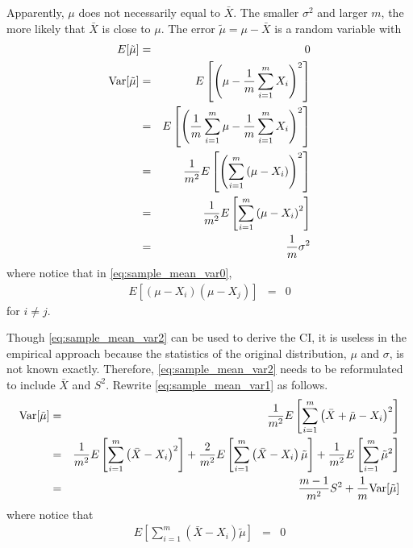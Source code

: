 Apparently, $\mu$ does not necessarily equal to $\bar{X}$. The smaller $\sigma^2$ and larger $m$, the more likely that $\bar{X}$ is close to $\mu$. The error $\tilde{\mu} = \mu - \bar{X}$ is a random variable with
\begin{eqnarray}
	E[\tilde{\mu}] &=& 0 \nonumber \\
	\textup{Var}[\tilde{\mu}] &=& E\left[\left(\mu-\dfrac{1}{m}\sum_{i=1}^{m} X_i\right)^2\right] \nonumber \\
	&=& E\left[\left(\dfrac{1}{m}\sum_{i=1}^{m}\mu-\dfrac{1}{m}\sum_{i=1}^{m} X_i\right)^2\right] \nonumber \\
	&=& \dfrac{1}{m^2}E\left[\left(\sum_{i=1}^{m}\left(\mu-X_i\right)\right)^2\right] \label{eq:sample_mean_var0} \\
	&=& \dfrac{1}{m^2}E\left[\sum_{i=1}^{m}\left(\mu-X_i\right)^2\right] \label{eq:sample_mean_var1} \\
	&=& \dfrac{1}{m}\sigma^2 \label{eq:sample_mean_var2}
\end{eqnarray}
where notice that in \eqref{eq:sample_mean_var0},
\begin{eqnarray}
	E\left[\left(\mu-X_i\right)\left(\mu-X_j\right)\right] &=& 0 \nonumber
\end{eqnarray}
for $i\neq j$.

Though \eqref{eq:sample_mean_var2} can be used to derive the CI, it is useless in the empirical approach because the statistics of the original distribution, $\mu$ and $\sigma$, is not known exactly. Therefore, \eqref{eq:sample_mean_var2} needs to be reformulated to include $\bar{X}$ and $S^2$. Rewrite \eqref{eq:sample_mean_var1} as follows.
\begin{eqnarray}
	\textup{Var}[\tilde{\mu}] &=& \dfrac{1}{m^2}E\left[\sum_{i=1}^{m}\left(\bar{X}+\tilde{\mu}-X_i\right)^2\right] \nonumber \\
	&=& \dfrac{1}{m^2}E\left[\sum_{i=1}^{m}\left(\bar{X}-X_i\right)^2\right] + \dfrac{2}{m^2}E\left[\sum_{i=1}^{m}\left(\bar{X}-X_i\right)\tilde{\mu}\right] + \dfrac{1}{m^2}E\left[\sum_{i=1}^{m}\tilde{\mu}^2\right] \nonumber \\
	&=& \dfrac{m-1}{m^2}S^2 + \dfrac{1}{m}\textup{Var}[\tilde{\mu}] \label{eq:sample_mean_var3}
\end{eqnarray}
where notice that
\begin{eqnarray}
    E\left[\sum_{i=1}^{m}\left(\bar{X}-X_i\right)\tilde{\mu}\right] &=& 0 \nonumber
\end{eqnarray}

